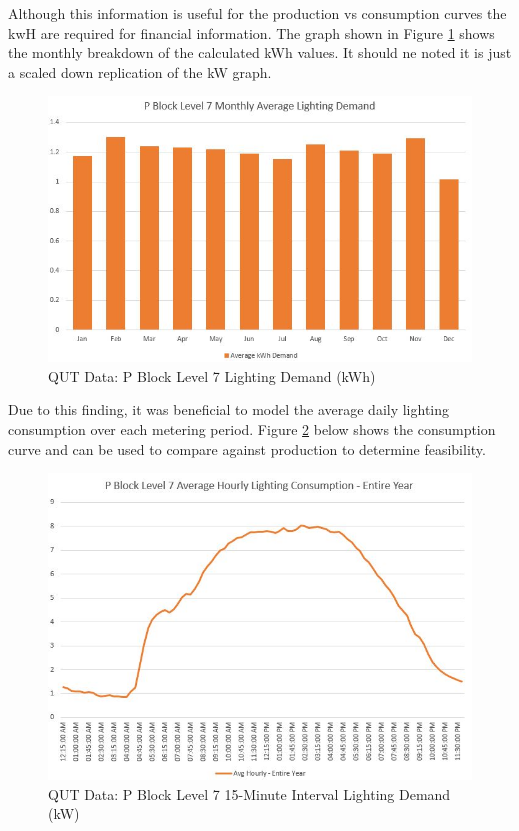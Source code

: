 Although this information is useful for the production vs consumption curves the kwH are required for financial information. The graph shown in Figure \ref{fig:pblock-lvl7-monthly-kwh} shows the monthly breakdown of the calculated kWh values. It should ne noted it is just a scaled down replication of the kW graph.    

\begin{figure}[H]
	\hfill\includegraphics[width = 150mm]{images/metering/pme/pblock-lvl7-monthly-kwh}\hspace*{\fill}
	\caption{QUT Data: P Block Level 7 Lighting Demand (kWh)} 
	\label{fig:pblock-lvl7-monthly-kwh}
\end{figure} 

Due to this finding, it was beneficial to model the average daily lighting consumption over each metering period. Figure \ref{fig:pblock-lvl7-15-minute} below shows the consumption curve and can be used to compare against production to determine feasibility.  

\begin{figure}[H]
	\hfill\includegraphics[width = 150mm]{images/metering/pme/pblock-lvl7-daily-avg-kw}\hspace*{\fill}
	\caption{QUT Data: P Block Level 7 15-Minute Interval Lighting Demand (kW)} 
	\label{fig:pblock-lvl7-15-minute}
\end{figure}


